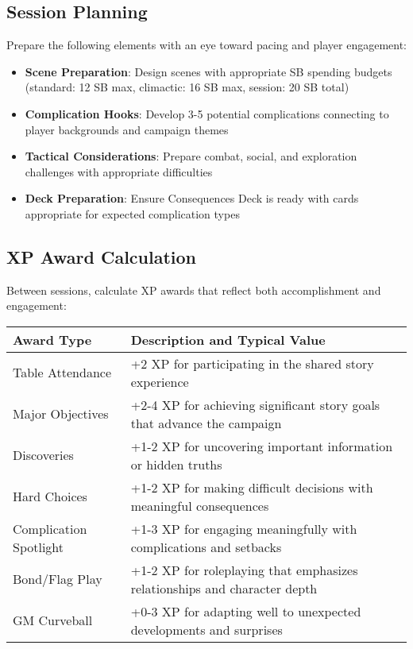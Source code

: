 \subsection*{Session Planning}

Prepare the following elements with an eye toward pacing and player engagement:

\begin{itemize}
    \item \textbf{Scene Preparation}: Design scenes with appropriate SB spending budgets (standard: 12 SB max, climactic: 16 SB max, session: 20 SB total)
    \item \textbf{Complication Hooks}: Develop 3-5 potential complications connecting to player backgrounds and campaign themes
    \item \textbf{Tactical Considerations}: Prepare combat, social, and exploration challenges with appropriate difficulties
    \item \textbf{Deck Preparation}: Ensure Consequences Deck is ready with cards appropriate for expected complication types
\end{itemize}

\subsection*{XP Award Calculation}

Between sessions, calculate XP awards that reflect both accomplishment and engagement:

\begin{fatebox}
\begin{tabularx}{\textwidth}{lX}
\toprule
\textbf{Award Type} & \textbf{Description and Typical Value} \\
\midrule
Table Attendance & +2 XP for participating in the shared story experience \\
Major Objectives & +2-4 XP for achieving significant story goals that advance the campaign \\
Discoveries & +1-2 XP for uncovering important information or hidden truths \\
Hard Choices & +1-2 XP for making difficult decisions with meaningful consequences \\
Complication Spotlight & +1-3 XP for engaging meaningfully with complications and setbacks \\
Bond/Flag Play & +1-2 XP for roleplaying that emphasizes relationships and character depth \\
GM Curveball & +0-3 XP for adapting well to unexpected developments and surprises \\
\bottomrule
\end{tabularx}
\end{fatebox}

